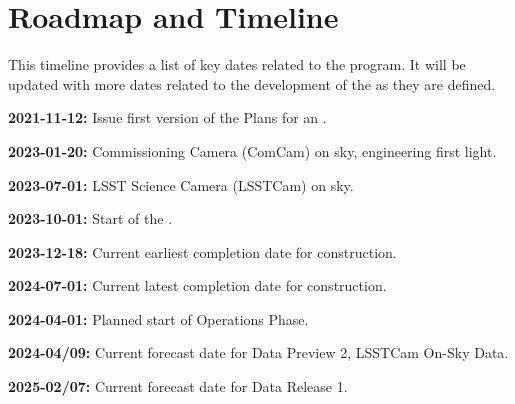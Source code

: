 \section{Roadmap and Timeline} \label{sec:timeline}

This timeline provides a list of key dates  related to the \es program. 
It will be updated with more dates related to the development of the \esp as they are defined. 

\textbf{2021-11-12:} Issue first version of the \ro Plans for an \esp. 

\textbf{2023-01-20:} Commissioning Camera (ComCam) on sky, engineering first light.

\textbf{2023-07-01:} LSST Science Camera (LSSTCam) on sky.

\textbf{2023-10-01:} Start of the \svs.

\textbf{2023-12-18:} Current earliest completion date for construction.

\textbf{2024-07-01:} Current latest completion date for construction.

\textbf{2024-04-01:} Planned start of Operations Phase.

\textbf{2024-04/09:} Current forecast date for Data Preview 2, LSSTCam On-Sky Data.

\textbf{2025-02/07:} Current forecast date for Data Release 1.